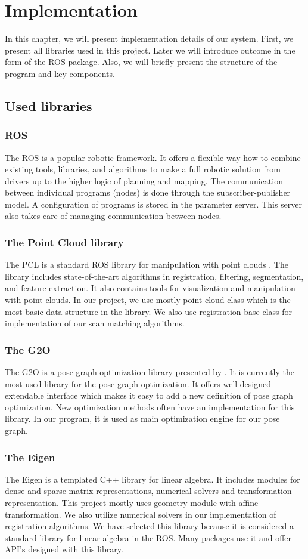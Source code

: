 \chapter{Implementation}
In this chapter, we will present implementation details of our system. First, we present all libraries used in this project. Later we will introduce outcome in the form of the \gls{ROS} package. Also, we will briefly present the structure of the program and key components.
\section{Used libraries}
\subsection {\gls{ROS}}
The \gls{ROS} \cite{ros_papper} is a popular robotic framework. It offers a flexible way how to combine existing tools, libraries, and algorithms to make a full robotic solution from drivers up to the higher logic of planning and mapping. The communication between individual programs (nodes) is done through the subscriber-publisher model. A configuration of programs is stored in the parameter server. This server also takes care of managing communication between nodes. 
\subsection{The Point Cloud library}
The \gls{PCL} is a standard \gls{ROS} library for manipulation with point clouds \cite{pcl}. The library includes state-of-the-art algorithms in registration, filtering, segmentation, and feature extraction. It also contains tools for visualization and manipulation with point clouds. In our project, we use mostly point cloud class which is the most basic data structure in the library. We also use registration base class for implementation of our scan matching algorithms. 
\subsection{The G2O}
The G2O is a pose graph optimization library presented by \cite{g2o}. It is currently the most used library for the pose graph optimization. It offers well designed extendable interface which makes it easy to add a new definition of pose graph optimization. New optimization methods often have an implementation for this library. In our program, it is used as main optimization engine for our pose graph.
\subsection{The Eigen}
The Eigen \cite{eigenweb} is a templated C++ library for linear algebra. It includes modules for dense and sparse matrix representations, numerical solvers and transformation representation. This project mostly uses geometry module with affine transformation. We also utilize numerical solvers in our implementation of registration algorithms. We have selected this library because it is considered a standard library for linear algebra in the \gls{ROS}. Many packages use it and offer API's designed with this library.   

